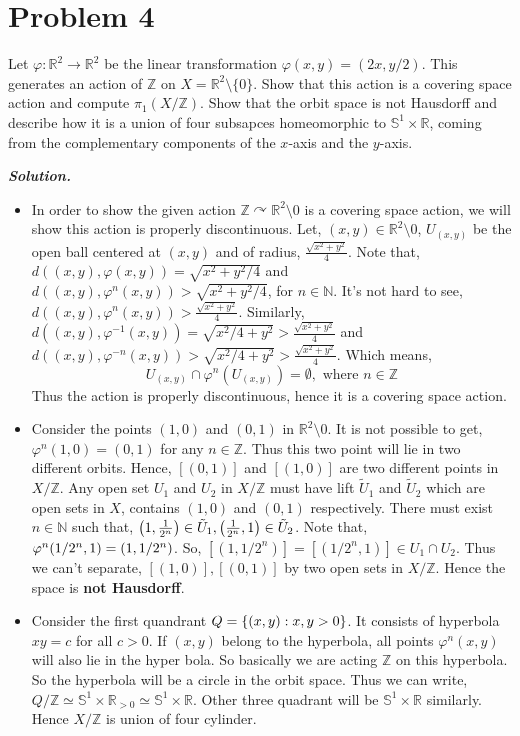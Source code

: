 \documentclass[11pt]{article}
\newcommand{\bb}[1]{\mathbb{#1}}
\newcommand{\N}{\bb{N}}
\newcommand{\Z}{\bb{Z}}
\newcommand{\R}{\mathbb{R}}
\newcommand{\s}{\bb{S}}
\newcommand{\sol}{ \textbf{\textit{Solution.}} }
\begin{document}
\section{Problem 4}

\begin{prob}{}{}
    Let $\varphi : \R^2 \to \R^2$ be the linear transformation $\varphi(x,y) = (2x,y/2)$. This generates an action of $\Z$ on $X = \R^2 \setminus \{0\}$. Show that this action is a covering space action and compute $\pi_1(X/\Z)$. Show that the orbit space is not Hausdorff and describe how it is a union of four subsapces homeomorphic to $\s^1 \times \R$, coming from the complementary components of the $x$-axis and the $y$-axis.
\end{prob}

\sol \begin{itemize}
  \item In order to show the given action $\Z \curvearrowright \R^2\setminus \qty{0}$ is a covering space action, we will show this action is properly discontinuous. Let, $(x,y)\in \R^2 \setminus \qty{0}$, $U_{(x,y)}$ be the open ball centered at $(x,y)$ and of radius, \(\frac{\sqrt{x^2+y^2}}{4}\). Note that, $d((x,y),\varphi(x,y)) = \sqrt{x^2 + y^2/4}$ and $d((x,y),\varphi^n(x,y)) > \sqrt{x^2 + y^2/4}$, for $n \in \N$. It's not hard to see, \(d((x,y),\varphi^n(x,y))>\frac{\sqrt{x^2+y^2}}{4}\). Similarly, \(d((x,y),\varphi^{-1}(x,y)) = \sqrt{x^2/4 + y^2} > \frac{\sqrt{x^2+y^2}}{4}\) and \(d((x,y),\varphi^{-n}(x,y)) > \sqrt{x^2/4 + y^2} > \frac{\sqrt{x^2+y^2}}{4}\). Which means, $$U_{(x,y)} \cap \varphi^n(U_{(x,y)}) = \emptyset , \text{ where } n \in \Z$$ Thus the action is properly discontinuous, hence it is a covering space action. 
  \item Consider the points $(1,0)$ and $(0,1)$ in $\R^2 \setminus \qty{0}$. It is not possible to get, $\varphi^n(1,0) = (0,1)$ for any $n \in \Z$. Thus this two point will lie in two different orbits. Hence, $[(0,1)]$ and $[(1,0)]$ are two different points in $X/\Z$. Any open set $U_1$ and $U_2$ in $X/\Z$ must have lift $\tilde{U}_1$ and $\tilde{U}_2$ which are open sets in $X$, contains $(1,0)$ and $(0,1)$ respectively. There must exist $n \in \N$ such that, \(\qty(1,\frac{1}{2^n})\in \tilde{U}_1 , \qty(\frac{1}{2^n},1) \in \tilde{U}_2\). Note that, \(\varphi^n\qty(1/2^n,1) = \qty(1,1/2^n)\). So, $[(1,1/2^n)] = [(1/2^n,1)] \in U_1 \cap U_2$. Thus we can't separate, $[(1,0)],[(0,1)]$ by two open sets in $X /\Z$. Hence the space is \textbf{\textsf{not Hausdorff}}. 
  \item Consider the first quandrant $Q=\qty{(x,y): x,y>0}$. It consists of hyperbola $xy =c$ for all $c>0$. If $(x,y)$ belong to the hyperbola, all points $\varphi^n(x,y)$ will also lie in the hyper bola. So basically we are acting $\Z$ on this hyperbola. So the hyperbola will be a circle in the orbit space. Thus we can write, $Q/\Z \simeq \s^1 \times \R_{>0} \simeq \s^1 \times \R$. Other three quadrant will be $\s^1 \times \R$ similarly. Hence $X/\Z$ is union of four cylinder. 

\end{itemize}
\end{document}

